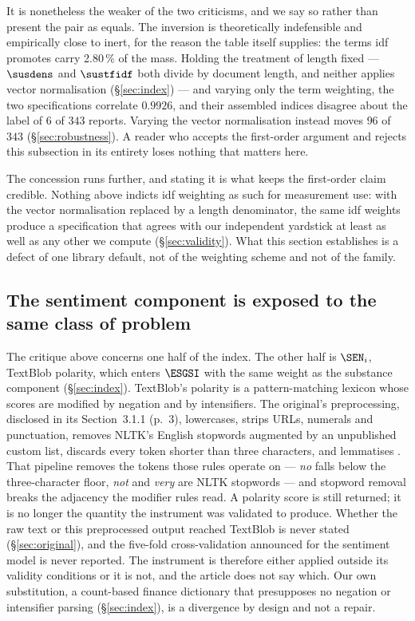 It is nonetheless the weaker of the two criticisms, and we say so rather than present the
pair as equals. The inversion is theoretically indefensible and empirically close to inert,
for the reason the table itself supplies: the terms idf promotes carry 2.80\,\% of the mass.
Holding the treatment of length fixed --- $\susdens$ and $\sustfidf$ both divide by document
length, and neither applies vector normalisation (\S\ref{sec:index}) --- and varying only the
term weighting, the two specifications correlate $0.9926$, and their assembled indices
disagree about the label of $6$ of $343$ reports. Varying the vector normalisation instead
moves $96$ of $343$ (\S\ref{sec:robustness}). A reader who accepts the first-order argument and
rejects this subsection in its entirety loses nothing that matters here.

The concession runs further, and stating it is what keeps the first-order claim credible.
Nothing above indicts idf weighting as such for measurement use: with the vector
normalisation replaced by a length denominator, the same idf weights produce a specification
that agrees with our independent yardstick at least as well as any other we compute
(\S\ref{sec:validity}). What this section establishes is a defect of one library default, not
of the weighting scheme and not of the family.

\subsection{The sentiment component is exposed to the same class of problem}

The critique above concerns one half of the index. The other half is $\SEN_i$, TextBlob
polarity, which enters $\ESGSI$ with the same weight as the substance component
(\S\ref{sec:index}). TextBlob's polarity is a pattern-matching lexicon whose scores are
modified by negation and by intensifiers. The original's preprocessing, disclosed in its
Section~3.1.1 (p.~3), lowercases, strips URLs, numerals and punctuation, removes NLTK's
English stopwords augmented by an unpublished custom list, discards every token shorter than
three characters, and lemmatises \citep{lagasio2024}. That pipeline removes the tokens those
rules operate on --- \emph{no} falls below the three-character floor, \emph{not} and
\emph{very} are NLTK stopwords --- and stopword removal breaks the adjacency the modifier
rules read. A polarity score is still returned; it is no longer the quantity the instrument
was validated to produce. Whether the raw text or this preprocessed output reached TextBlob
is never stated (\S\ref{sec:original}), and the five-fold cross-validation announced for the
sentiment model is never reported. The instrument is therefore either applied outside its
validity conditions or it is not, and the article does not say which.
Our own substitution, a count-based finance dictionary that presupposes no negation or
intensifier parsing (\S\ref{sec:index}), is a divergence by design and not a repair.

